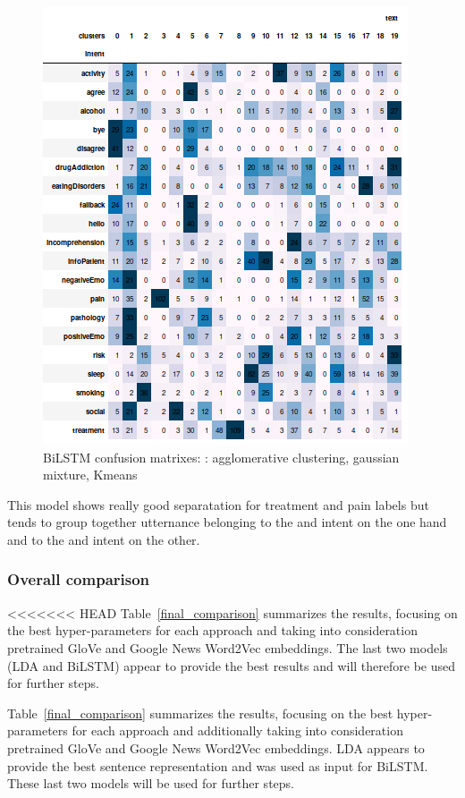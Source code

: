 \documentclass[11pt]{article}
\begin{document}
\begin{figure}[h]
	\includegraphics[scale=0.28]{bilstm_km_cm.png}
	\caption{BiLSTM confusion matrixes: : agglomerative clustering, gaussian mixture, Kmeans}
\label{lda_gm_cm}
\end{figure}
\FloatBarrier

This model shows really good separatation for treatment and pain labels but  
tends to group together utternance belonging to the {} and  {} intent on the one hand and to the  {} and  {} intent on the other.

\subsubsection{Overall comparison}

<<<<<<< HEAD
Table~\ref{final_comparison} summarizes the results, focusing on the best hyper-parameters for each approach and  taking into consideration pretrained GloVe and Google News Word2Vec embeddings. The last two models (LDA and BiLSTM) appear to provide the best results and will therefore
be used for further steps.

Table~\ref{final_comparison} summarizes the results, focusing on the best hyper-parameters for each approach and additionally taking into consideration pretrained GloVe and Google News Word2Vec embeddings. LDA appears to provide the best sentence representation and was used as input for BiLSTM. These last two models will be used for further steps.
\end{document}
